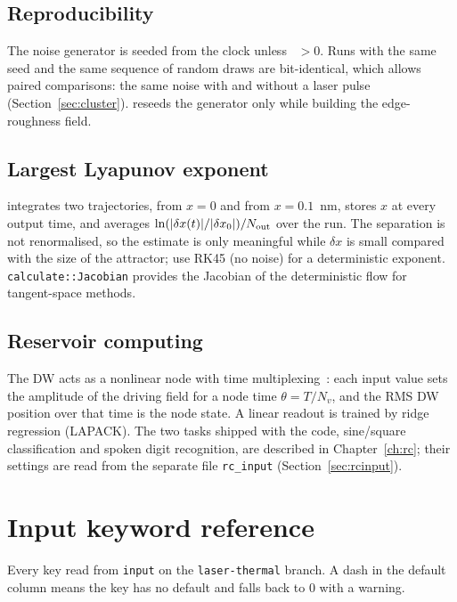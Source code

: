 \documentclass[11pt,a4paper]{report}
\newcommand{\key}[1]{\texttt{\detokenize{#1}}}
\begin{document}
\section{Reproducibility}
The noise generator is seeded from the clock unless \key{rng_seed}~$>0$. Runs with the same seed and the same sequence of random draws are bit-identical, which allows paired comparisons: the same noise with and without a laser pulse (Section~\ref{sec:cluster}). \key{edge_seed} reseeds the generator only while building the edge-roughness field.

\section{Largest Lyapunov exponent}
\key{program=Lyapunov} integrates two trajectories, from $x=0$ and from $x=0.1$~nm, stores $x$ at every output time, and averages $\ln(|\delta x(t)|/|\delta x_0|)/N_{\rm out}$ over the run. The separation is not renormalised, so the estimate is only meaningful while $\delta x$ is small compared with the size of the attractor; use RK45 (no noise) for a deterministic exponent. \texttt{calculate::Jacobian} provides the Jacobian of the deterministic flow for tangent-space methods.

\section{Reservoir computing}
The DW acts as a nonlinear node with time multiplexing~\cite{ababei2021}: each input value sets the amplitude of the driving field for a node time $\theta=T/N_v$, and the RMS DW position over that time is the node state. A linear readout is trained by ridge regression (LAPACK). The two tasks shipped with the code, sine/square classification and spoken digit recognition, are described in Chapter~\ref{ch:rc}; their settings are read from the separate file \texttt{rc\_input} (Section~\ref{sec:rcinput}).

\chapter{Input keyword reference}\label{ch:keywords}

Every key read from \texttt{input} on the \texttt{laser-thermal} branch. A dash in the default column means the key has no default and falls back to 0 with a warning.

\newcommand{\kwtable}[1]{{\small\begin{longtable}{@{}>{\raggedright}p{4.0cm} >{\raggedright}p{1.9cm} >{\raggedright}p{2.6cm} >{\raggedright\arraybackslash}p{6.0cm}@{}}\toprule Key & Unit & Default & Meaning\\\midrule\endhead #1\bottomrule\end{longtable}}}
\end{document}
